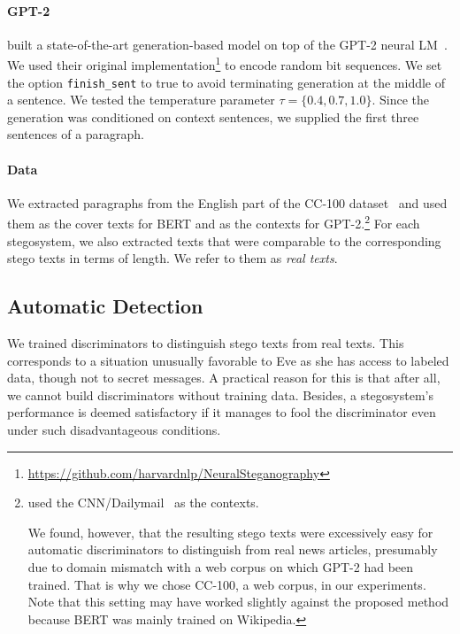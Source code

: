 \documentclass[11pt]{article}
\begin{document}
\paragraph{GPT-2}
\citet{ziegler-etal-2019-neural} built a state-of-the-art generation-based model on top of the GPT-2 neural LM~\citep{radford2019language}.
We used their original implementation\footnote{\href{https://github.com/harvardnlp/NeuralSteganography}{https://github.com/harvardnlp/NeuralSteganography}} to encode random bit sequences.
We set the option \texttt{finish\_sent} to true to avoid terminating generation at the middle of a sentence.
We tested the temperature parameter $\tau=\{0.4, 0.7, 1.0\}$.
Since the generation was conditioned on context sentences, we supplied the first three sentences of a paragraph.

\paragraph{Data}
We extracted paragraphs from the English part of the CC-100 dataset~\citep{wenzek-etal-2020-ccnet} and used them as the cover texts for BERT and as the contexts for GPT-2.\footnote{
\citet{ziegler-etal-2019-neural} used the CNN/Dailymail~\citep{NIPS2015_afdec700,nallapati-etal-2016-abstractive} as the contexts.

We found, however, that the resulting stego texts were excessively easy for automatic discriminators to distinguish from real news articles, presumably due to domain mismatch with a web corpus on which GPT-2 had been trained.
That is why we chose CC-100, a web corpus, in our experiments.
Note that this setting may have worked slightly against the proposed method because BERT was mainly trained on Wikipedia.
}
For each stegosystem, we also extracted texts that were comparable to the corresponding stego texts in terms of length. We refer to them as \textit{real texts}.


\subsection{Automatic Detection}
We trained discriminators to distinguish stego texts from real texts.
This corresponds to a situation unusually favorable to Eve as she has access to labeled data, though not to secret messages.
A practical reason for this is that after all, we cannot build discriminators without training data.
Besides, a stegosystem's performance is deemed satisfactory if it manages to fool the discriminator even under such disadvantageous conditions.
\end{document}
